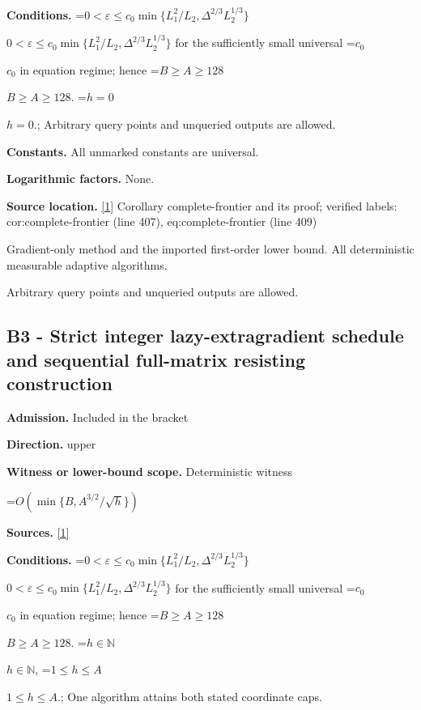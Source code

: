 \documentclass[10pt,a4paper]{article}
\newcommand{\AtlasMath}[1]{\par\begingroup\centering\setbox0=\hbox{$\displaystyle #1$}\ifdim\wd0>1.4\linewidth\typeout{ATLAS WIDE FORMULA: \the\wd0}\fi\ifdim\wd0>\linewidth\resizebox{\linewidth}{!}{\box0}\else\box0\fi\par\endgroup}
\newcommand{\AtlasInlineMath}[1]{\begingroup\setbox0=\hbox{$#1$}\ifdim\wd0>.4\linewidth\endgroup\AtlasMath{#1}\else\endgroup$#1$\fi}
\begin{document}
\textbf{Conditions.} \AtlasInlineMath{0<\varepsilon\le c_0\min\{L_1^2/L_2,\Delta^{2/3}L_2^{1/3}\}} for the sufficiently small universal \AtlasInlineMath{c_0} in equation regime; hence \AtlasInlineMath{B\ge A\ge128}. \AtlasInlineMath{h=0}.; Arbitrary query points and unqueried outputs are allowed.



\textbf{Constants.} All unmarked constants are universal.



\textbf{Logarithmic factors.} None.



\textbf{Source location.} \href{https://github.com/WU-Wendao/Colombo/blob/main/colombo_sensorium/Complexity_altas/data/sources/colombo/0904/manuscript.pdf}{[1]} Corollary complete-frontier and its proof; verified labels: cor:complete-frontier (line 407), eq:complete-frontier (line 409)



Gradient-only method and the imported first-order lower bound. All deterministic measurable adaptive algorithms.



Arbitrary query points and unqueried outputs are allowed.



\subsection{B3 - Strict integer lazy-extragradient schedule and sequential full-matrix resisting construction}


\textbf{Admission.} Included in the bracket



\textbf{Direction.} upper



\textbf{Witness or lower-bound scope.} Deterministic witness



\AtlasMath{O\!\left(\min\{B,A^{3/2}/\sqrt h\}\right)}


\textbf{Sources.} \href{https://github.com/WU-Wendao/Colombo/blob/main/colombo_sensorium/Complexity_altas/data/sources/colombo/0904/manuscript.pdf}{[1]}



\textbf{Conditions.} \AtlasInlineMath{0<\varepsilon\le c_0\min\{L_1^2/L_2,\Delta^{2/3}L_2^{1/3}\}} for the sufficiently small universal \AtlasInlineMath{c_0} in equation regime; hence \AtlasInlineMath{B\ge A\ge128}. \AtlasInlineMath{h\in\mathbb N}, \AtlasInlineMath{1\le h\le A}.; One algorithm attains both stated coordinate caps.
\end{document}
